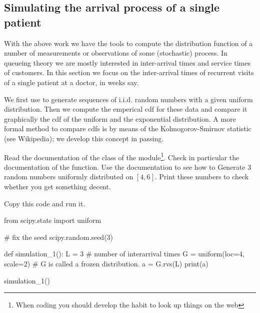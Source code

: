 \subsection{Simulating the arrival process of a single patient}
\label{sec:simulations}

With the above work we have the tools to compute the distribution function of a number of measurements or observations of some (stochastic) process.
In queueing theory we are mostly interested in inter-arrival times and service times of customers.
In this section we focus on the inter-arrival times of recurrent visits of a single patient at a doctor, in weeks say.

We first use  to generate sequences of i.i.d.
random numbers with a given uniform distribution.
Then we compute the emperical cdf for these data and compare it graphically the cdf of the uniform and the exponential distribution.
A more formal method to compare cdfs is by means of the Kolmogorov-Smirnov statistic (see Wikipedia);  we develop this concept in passing.

\begin{exercise}
  Read the documentation of the  class of the  module\footnote{When coding you should develop the habit to look up things on the web}.
  Check in particular the documentation of the  function.
  Use the documentation to see how to Generate 3 random numbers uniformly distributed on $[4,6]$.
  Print these numbers to check whether you get something decent.

\begin{solution}
Copy this code and run it.
\begin{pyverbatim}
from scipy.stats import uniform

# fix the seed
scipy.random.seed(3)


def simulation_1():
    L = 3  # number of interarrival times
    G = uniform(loc=4, scale=2)  # G is called a frozen distribution.
    a = G.rvs(L)
    print(a)


simulation_1()
\end{pyverbatim}

\end{solution}

\end{exercise}


